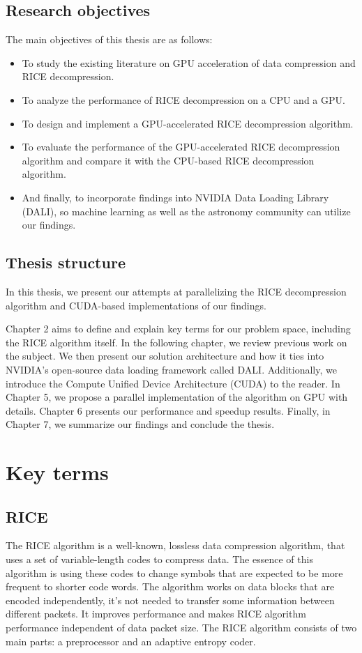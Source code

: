 \documentclass[licencjacka,en]{pracamgr}
\begin{document}
\section{Research objectives}
The main objectives of this thesis are as follows:

\begin{itemize}
	\item To study the existing literature on GPU acceleration of data compression and RICE decompression.
	\item To analyze the performance of RICE decompression on a CPU and a GPU.
	\item To design and implement a GPU-accelerated RICE decompression algorithm.
	\item To evaluate the performance of the GPU-accelerated RICE decompression algorithm and compare it with the CPU-based RICE decompression algorithm.
	\item And finally, to incorporate findings into NVIDIA Data Loading Library (DALI), so machine learning as well as the astronomy community can utilize our findings.
\end{itemize}

\section{Thesis structure}
In this thesis, we present our attempts at parallelizing the RICE decompression algorithm and CUDA-based implementations of our findings.

Chapter 2 aims to define and explain key terms for our problem space, including the RICE algorithm itself. In the following chapter, we review previous work on the subject. We then present our solution architecture and how it ties into NVIDIA's open-source data loading framework called DALI. Additionally, we introduce the Compute Unified Device Architecture (CUDA) to the reader. In Chapter 5, we propose a parallel implementation of the algorithm on GPU with details. Chapter 6 presents our performance and speedup results. Finally, in Chapter 7, we summarize our findings and conclude the thesis.

\chapter{Key terms}\label{r:pojecia}


\section{RICE}
The RICE algorithm is a well-known, lossless data compression algorithm, that uses a set of variable-length codes to compress data. The essence of this algorithm is using these codes to change symbols that are expected to be more frequent to shorter code words. The algorithm works on data blocks that are encoded independently, it’s not needed to transfer some information between different packets. It improves performance and makes RICE algorithm performance independent of data packet size. The RICE algorithm consists of two main parts: a preprocessor and an adaptive entropy coder.
\end{document}

